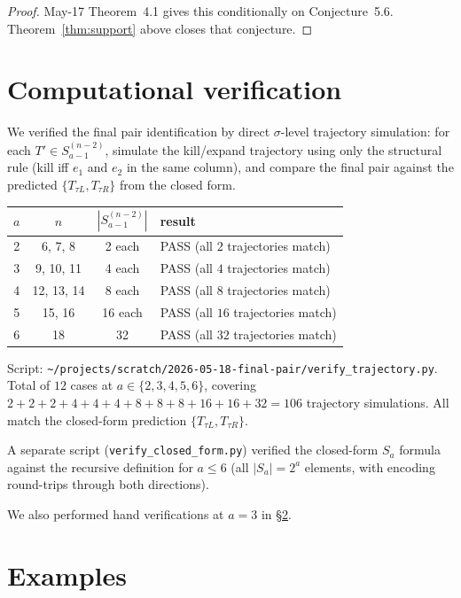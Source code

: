 \documentclass[11pt]{article}
\theoremstyle{definition}
\begin{document}
\begin{proof}
May-17 Theorem~4.1 gives this conditionally on Conjecture~5.6.
Theorem~\ref{thm:support} above closes that conjecture.
\end{proof}

\section{Computational verification}\label{sec:verify}

We verified the final pair identification by direct $\sigma$-level
trajectory simulation: for each $T'\in S_{a-1}^{(n-2)}$, simulate the
kill/expand trajectory using only the structural rule (kill iff $e_1$
and $e_2$ in the same column), and compare the final pair against the
predicted $\{T_{\tau L},T_{\tau R}\}$ from the closed form.

\begin{center}
\begin{tabular}{c c c l}
\toprule
$a$ & $n$ & $|S_{a-1}^{(n-2)}|$ & result \\
\midrule
2 & 6, 7, 8       & 2 each   & PASS (all $2$ trajectories match) \\
3 & 9, 10, 11     & 4 each   & PASS (all $4$ trajectories match) \\
4 & 12, 13, 14    & 8 each   & PASS (all $8$ trajectories match) \\
5 & 15, 16        & 16 each  & PASS (all $16$ trajectories match) \\
6 & 18            & 32       & PASS (all $32$ trajectories match) \\
\bottomrule
\end{tabular}
\end{center}

Script: \texttt{\textasciitilde/projects/scratch/2026-05-18-final-pair/verify\_trajectory.py}.
Total of $12$ cases at $a\in\{2,3,4,5,6\}$, covering $2+2+2+4+4+4+8+8+8+16+16+32=106$
trajectory simulations.  All match the closed-form prediction
$\{T_{\tau L},T_{\tau R}\}$.

A separate script
(\texttt{verify\_closed\_form.py}) verified the closed-form $S_a$
formula against the recursive definition for $a\le 6$ (all $|S_a|=2^a$
elements, with encoding round-trips through both directions).

We also performed hand verifications at $a=3$ in
\S\ref{sec:examples}.

\section{Examples}\label{sec:examples}
\end{document}
